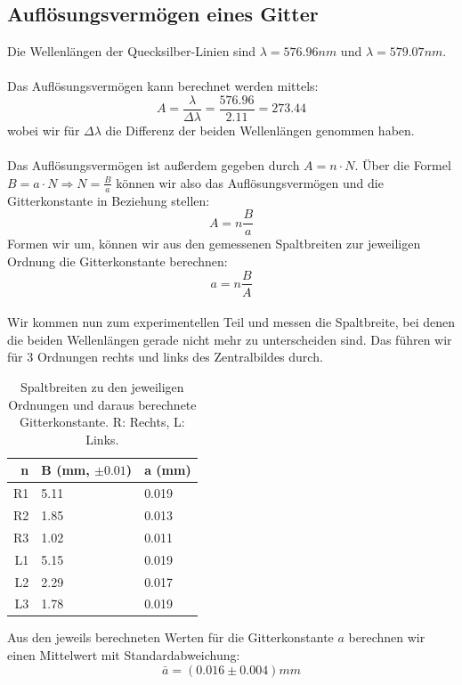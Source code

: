 \documentclass{article}
\begin{document}
\subsection*{Auflösungsvermögen eines Gitter}
%
%
Die Wellenlängen der Quecksilber-Linien sind $\lambda=576.96nm$ und $\lambda=579.07nm$.\\
\\
Das Auflösungsvermögen kann berechnet werden mittels:
$$\boxed{A=\frac{\lambda}{\Delta\lambda}=\frac{576.96}{2.11}=273.44}$$
wobei wir für $\Delta\lambda$ die Differenz der beiden Wellenlängen genommen haben.\\
\\
Das Auflösungsvermögen ist außerdem gegeben durch $A=n\cdot N$. Über die Formel $B=a\cdot N \Rightarrow N=\frac{B}{a}$ können wir also das Auflösungsvermögen und die Gitterkonstante in Beziehung stellen:
$$A=n\frac{B}{a}$$
Formen wir um, können wir aus den gemessenen Spaltbreiten zur jeweiligen Ordnung die Gitterkonstante berechnen:
$$\boxed{a=n\frac{B}{A}}$$
\\
Wir kommen nun zum experimentellen Teil und messen die Spaltbreite, bei denen die beiden Wellenlängen gerade nicht mehr zu unterscheiden sind. Das führen wir für 3 Ordnungen rechts und links des Zentralbildes durch.
\begin{table}[H]
\begin{center}
\begin{tabular}{|r|l|l|}
\hline
n & B (mm, $\pm 0.01$) & a (mm)\\
\hline
R1 & 5.11 & 0.019\\
R2 & 1.85 & 0.013\\
R3 & 1.02 & 0.011\\
L1 & 5.15 & 0.019\\
L2 & 2.29 & 0.017\\
L3 & 1.78 & 0.019\\
\hline
\end{tabular}
\caption{Spaltbreiten zu den jeweiligen Ordnungen und daraus berechnete Gitterkonstante. R: Rechts, L: Links.}
\end{center}
\end{table}
\vspace{0.3mm}
Aus den jeweils berechneten Werten für die Gitterkonstante $a$ berechnen wir einen Mittelwert mit Standardabweichung:
$$\boxed{\bar{a}=(0.016 \pm 0.004)mm}$$
\end{document}
